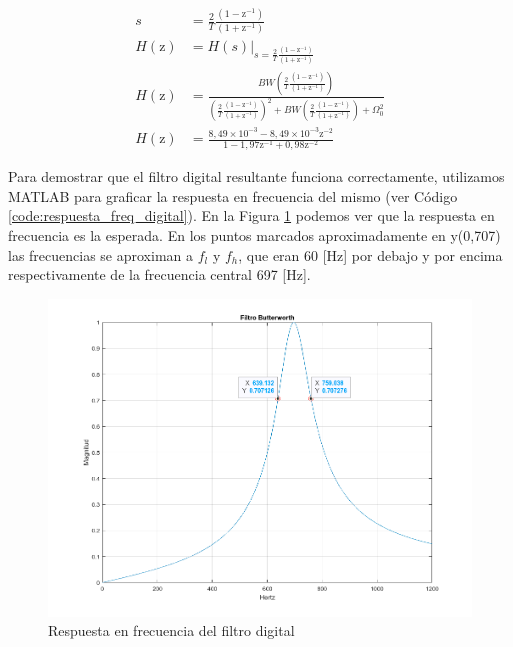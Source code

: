 \begin{align}
  s             & = \frac{2}{T}\frac{(1-\textrm{z}^{-1})}{(1+\textrm{z}^{-1})} \label{eq:transf_s_a_z}                                                                                                                                                                     \\
  H(\textrm{z}) & = H(s)|_{s = \frac{2}{T}\frac{(1-\textrm{z}^{-1})}{(1+\textrm{z}^{-1})}}                                                                                                                                                                                 \\
  H(\textrm{z}) & = \frac{BW \left(\frac{2}{T}\frac{(1-\textrm{z}^{-1})}{(1+\textrm{z}^{-1})}\right)}{\left(\frac{2}{T}\frac{(1-\textrm{z}^{-1})}{(1+\textrm{z}^{-1})}\right)^2 + BW \left(\frac{2}{T}\frac{(1-\textrm{z}^{-1})}{(1+\textrm{z}^{-1})}\right) + \Omega_0^2} \\
  H(\textrm{z}) & = \frac{8,49\times 10^{-3} - 8,49\times 10^{-3}\textrm{z}^{-2}}{1 - 1,97\textrm{z}^{-1} + 0,98\textrm{z}^{-2}} \label{eq:filtro_digital_bp}
\end{align}

Para demostrar que el filtro digital resultante funciona correctamente, utilizamos MATLAB para graficar la respuesta en frecuencia del mismo (ver Código \ref{code:respuesta_freq_digital}). En la Figura \ref{fig:respuesta_freq_digital} podemos ver que la respuesta en frecuencia es la esperada. En los puntos marcados aproximadamente en y(0,707) las frecuencias se aproximan a $f_l$ y $f_h$, que eran 60 [Hz] por debajo y por encima respectivamente de la frecuencia central 697 [Hz].

\begin{figure}[H]
  
\end{figure}


\begin{figure}[H]
  \centering
  \includegraphics[width=\linewidth]{images/respuesta_frecuencia_digital.png}
  \caption{Respuesta en frecuencia del filtro digital}
  \label{fig:respuesta_freq_digital}
\end{figure}

